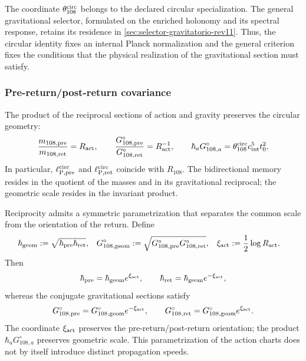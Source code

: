The coordinate \(\theta_{108}^{\rm circ}\) belongs to the declared circular
specialization. The general gravitational selector, formulated on the
enriched holonomy and its spectral response, retains its residence in
\cref{sec:selector-gravitatorio-rev11}. Thus, the circular
identity fixes an internal Planck normalization and the general criterion
fixes the conditions that the physical realization of the gravitational
section must satisfy.

\subsubsection{Pre-return/post-return covariance}

The product of the reciprocal sections of action and gravity preserves the
circular geometry:
\begin{equation}
 \frac{m_{108,\rm pre}}{m_{108,\rm ret}}=R_{\rm act},
 \qquad
 \frac{G_{108,\rm pre}^{\circ}}{G_{108,\rm ret}^{\circ}}
 =R_{\rm act}^{-1},
 \qquad
 \hbar_a G_{108,a}^{\circ}
 =\theta_{108}^{\rm circ}c_{\rm int}^{5}t_0^2.
 \label{eq:planck-ct108-covariancia-pre-ret-rev3}
\end{equation}
In particular, \(\ell_{{\rm P},\rm pre}^{\rm circ}\) and
\(\ell_{{\rm P},\rm ret}^{\rm circ}\) coincide with \(R_{108}\). The
bidirectional memory resides in the quotient of the masses and in its
gravitational reciprocal; the geometric scale resides in the invariant product.

Reciprocity admits a symmetric parametrization that separates the common
scale from the orientation of the return. Define
\begin{equation}
 \begin{aligned}
 \hbar_{\rm geom}
 &:=\sqrt{\hbar_{\rm pre}\hbar_{\rm ret}},
 &
 G_{108,\rm geom}^{\circ}
 &:=\sqrt{G_{108,\rm pre}^{\circ}G_{108,\rm ret}^{\circ}},
 &
 \xi_{\rm act}&:=\frac12\log R_{\rm act}.
 \end{aligned}
 \label{eq:planck-ct108-parametrizacion-simetrica-rev3}
\end{equation}
Then
\[
 \hbar_{\rm pre}=\hbar_{\rm geom}e^{\xi_{\rm act}},
 \qquad
 \hbar_{\rm ret}=\hbar_{\rm geom}e^{-\xi_{\rm act}},
\]
whereas the conjugate gravitational sections satisfy
\[
 G_{108,\rm pre}^{\circ}
 =G_{108,\rm geom}^{\circ}e^{-\xi_{\rm act}},
 \qquad
 G_{108,\rm ret}^{\circ}
 =G_{108,\rm geom}^{\circ}e^{\xi_{\rm act}}.
\]
The coordinate \(\xi_{\rm act}\) preserves the pre-return/post-return
orientation; the product \(\hbar_aG_{108,a}^{\circ}\)
preserves geometric scale. This parametrization of the action charts
does not by itself introduce distinct propagation speeds.

